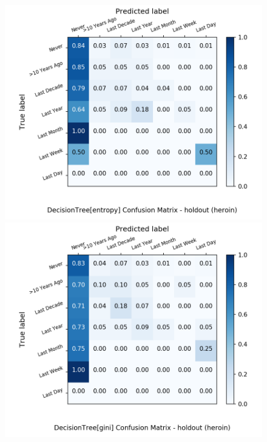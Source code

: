 \begin{figure}[H]
	\centering
	\begin{minipage}[b]{0.32\textwidth}
		\includegraphics[width=1.1\textwidth]{Plots/heroin_DecisionTree_entropy_balance_False_holdout.png}
	\end{minipage}
	\begin{minipage}[b]{0.32\textwidth}
		\includegraphics[width=1.1\textwidth]{Plots/heroin_DecisionTree_gini_balance_False_holdout.png}
	\end{minipage}
	\begin{minipage}[b]{0.32\textwidth}

\end{minipage}
\end{figure}

